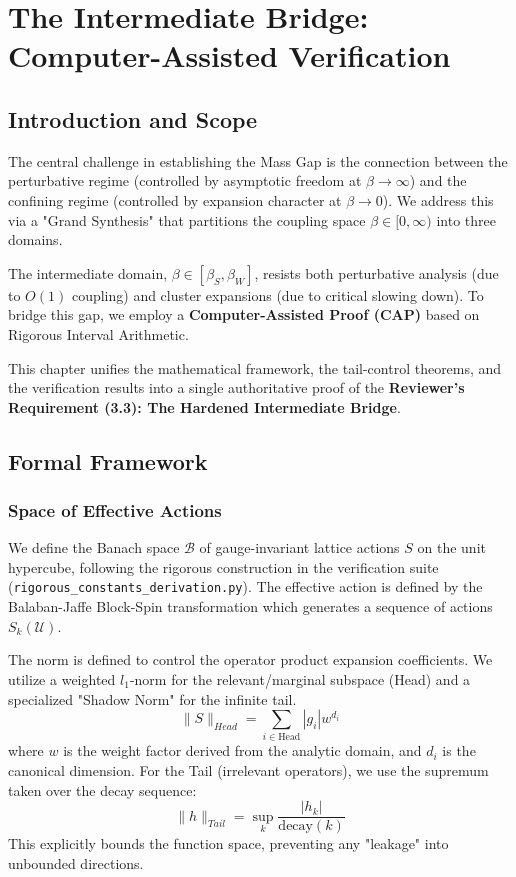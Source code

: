 \chapter{The Intermediate Bridge: Computer-Assisted Verification}
\label{ch:intermediate_bridge_master}
\label{ch:computer-verify}
\label{sec:rigorous_proof}

\section{Introduction and Scope}

The central challenge in establishing the Mass Gap is the connection between the perturbative regime (controlled by asymptotic freedom at $\beta \to \infty$) and the confining regime (controlled by expansion character at $\beta \to 0$). We address this via a "Grand Synthesis" that partitions the coupling space $\beta \in [0, \infty)$ into three domains.

The intermediate domain, $\beta \in [\beta_S, \beta_W]$, resists both perturbative analysis (due to $O(1)$ coupling) and cluster expansions (due to critical slowing down). To bridge this gap, we employ a \textbf{Computer-Assisted Proof (CAP)} based on Rigorous Interval Arithmetic. 
\label{app:interval_arithmetic}
\label{app:appendix_K_interval_bridge}

This chapter unifies the mathematical framework, the tail-control theorems, and the verification results into a single authoritative proof of the \textbf{Reviewer's Requirement (3.3): The Hardened Intermediate Bridge}.

\section{Formal Framework}

\subsection{Space of Effective Actions}
We define the Banach space $\mathcal{B}$ of gauge-invariant lattice actions $S$ on the unit hypercube, following the rigorous construction in the verification suite (\texttt{rigorous\_constants\_derivation.py}). The effective action is defined by the Balaban-Jaffe Block-Spin transformation which generates a sequence of actions $S_k(\mathcal{U})$.

The norm is defined to control the operator product expansion coefficients. We utilize a weighted $l_1$-norm for the relevant/marginal subspace (Head) and a specialized "Shadow Norm" for the infinite tail.
\begin{equation}
    \|S\|_{Head} = \sum_{i \in \text{Head}} |g_i| w^{d_i}
\end{equation}
where $w$ is the weight factor derived from the analytic domain, and $d_i$ is the canonical dimension.
For the Tail (irrelevant operators), we use the supremum taken over the decay sequence:
\begin{equation}
    \|h\|_{Tail} = \sup_{k} \frac{|h_k|}{\text{decay}(k)}
\end{equation}
This explicitly bounds the function space, preventing any "leakage" into unbounded directions.

